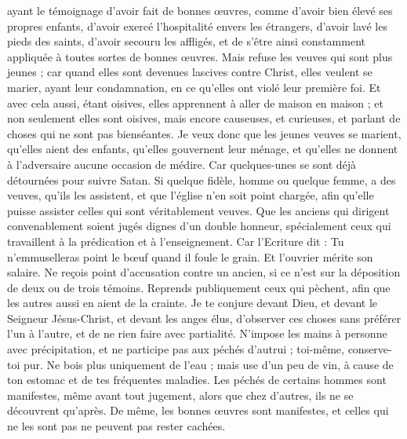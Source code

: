 \begin{multicols}{2}
ayant le témoignage d'avoir fait de bonnes œuvres, comme d'avoir bien élevé ses propres enfants, d'avoir exercé l'hospitalité envers les étrangers, d'avoir lavé les pieds des saints, d'avoir secouru les affligés, et de s'être ainsi constamment appliquée à toutes sortes de bonnes œuvres.
Mais refuse les veuves qui sont plus jeunes ; car quand elles sont devenues lascives contre Christ, elles veulent se marier,
ayant leur condamnation, en ce qu'elles ont violé leur première foi.
Et avec cela aussi, étant oisives, elles apprennent à aller de maison en maison ; et non seulement elles sont oisives, mais encore causeuses, et curieuses, et parlant de choses qui ne sont pas bienséantes.
Je veux donc que les jeunes veuves se marient, qu'elles aient des enfants, qu'elles gouvernent leur ménage, et qu'elles ne donnent à l'adversaire aucune occasion de médire.
Car quelques-unes se sont déjà détournées pour suivre Satan.
Si quelque fidèle, homme ou quelque femme, a des veuves, qu'ils les assistent, et que l'église n'en soit point chargée, afin qu'elle puisse assister celles qui sont véritablement veuves.
Que les anciens qui dirigent convenablement soient jugés dignes d'un double honneur, spécialement ceux qui travaillent à la prédication et à l'enseignement.
Car l'Ecriture dit : Tu n'emmuselleras point le bœuf quand il foule le grain. Et l'ouvrier mérite son salaire.
Ne reçois point d'accusation contre un ancien, si ce n'est sur la déposition de deux ou de trois témoins.
Reprends publiquement ceux qui pèchent, afin que les autres aussi en aient de la crainte.
Je te conjure devant Dieu, et devant le Seigneur Jésus-Christ, et devant les anges élus, d'observer ces choses sans préférer l'un à l'autre, et de ne rien faire avec partialité.
N'impose les mains à personne avec précipitation, et ne participe pas aux péchés d'autrui ; toi-même, conserve-toi pur.
Ne bois plus uniquement de l'eau ; mais use d'un peu de vin, à cause de ton estomac et de tes fréquentes maladies.
Les péchés de certains hommes sont manifestes, même avant tout jugement, alors que chez d'autres, ils ne se découvrent qu'après.
De même, les bonnes œuvres sont manifestes, et celles qui ne les sont pas ne peuvent pas rester cachées.

\end{multicols}
